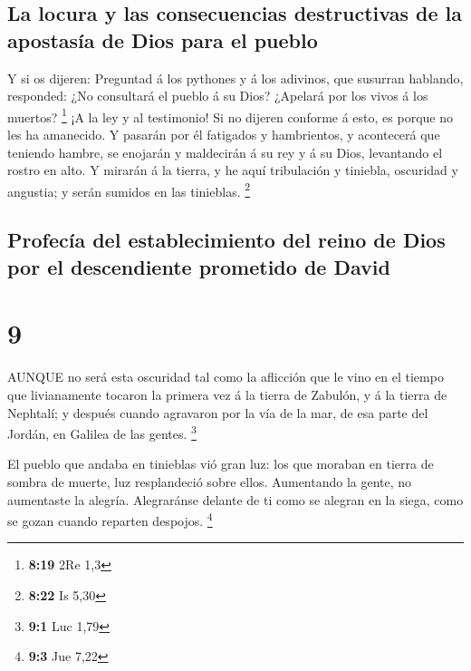 \hypertarget{la-locura-y-las-consecuencias-destructivas-de-la-apostasuxeda-de-dios-para-el-pueblo}{%
\subsection{La locura y las consecuencias destructivas de la apostasía
de Dios para el
pueblo}\label{la-locura-y-las-consecuencias-destructivas-de-la-apostasuxeda-de-dios-para-el-pueblo}}

 Y si os dijeren: Preguntad á los pythones y á los
adivinos, que susurran hablando, responded: ¿No consultará el pueblo á
su Dios? ¿Apelará por los vivos á los muertos? \footnote{\textbf{8:19}
  2Re 1,3}  ¡A la ley y al testimonio! Si no dijeren
conforme á esto, es porque no les ha amanecido.  Y pasarán
por él fatigados y hambrientos, y acontecerá que teniendo hambre, se
enojarán y maldecirán á su rey y á su Dios, levantando el rostro en
alto.  Y mirarán á la tierra, y he aquí tribulación y
tiniebla, oscuridad y angustia; y serán sumidos en las tinieblas.
\footnote{\textbf{8:22} Is 5,30}

\hypertarget{profecuxeda-del-establecimiento-del-reino-de-dios-por-el-descendiente-prometido-de-david}{%
\subsection{Profecía del establecimiento del reino de Dios por el
descendiente prometido de
David}\label{profecuxeda-del-establecimiento-del-reino-de-dios-por-el-descendiente-prometido-de-david}}

\hypertarget{section-8}{%
\section{9}\label{section-8}}

 AUNQUE no será esta oscuridad tal como la aflicción que le
vino en el tiempo que livianamente tocaron la primera vez á la tierra de
Zabulón, y á la tierra de Nephtalí; y después cuando agravaron por la
vía de la mar, de esa parte del Jordán, en Galilea de las gentes.
\footnote{\textbf{9:1} Luc 1,79}

 El pueblo que andaba en tinieblas vió gran luz: los que
moraban en tierra de sombra de muerte, luz resplandeció sobre ellos.
 Aumentando la gente, no aumentaste la alegría. Alegraránse
delante de ti como se alegran en la siega, como se gozan cuando reparten
despojos. \footnote{\textbf{9:3} Jue 7,22}

